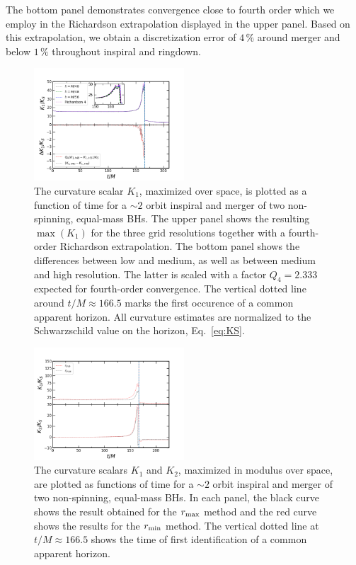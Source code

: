 \documentclass[floats,floatfix,showpacs,amssymb,prd,twocolumn,superscriptaddress,nofootinbib,nolongbibliography,reprint]{revtex4-2}
\begin{document}
The bottom panel
demonstrates convergence close to fourth order which
we employ in the Richardson extrapolation displayed
in the upper panel. Based on this extrapolation, we
obtain a discretization error of $4\,\%$ around
merger and below $1\,\%$ throughout inspiral and ringdown.
%
\begin{figure}
\includegraphics[width=0.5\textwidth]{bhmerger/fig4plt.png}
\caption{
The curvature scalar $K_1$, maximized over space,
is plotted as a function of time for a $\sim 2$ orbit inspiral and merger of two non-spinning, equal-mass BHs.
The upper panel shows the resulting $\max(K_1)$ 
for the three grid resolutions
together with a fourth-order Richardson extrapolation.
The bottom panel shows the differences
between low and medium, as well as between medium
and high resolution. The latter is scaled
with a factor $Q_4=2.333$ expected for
fourth-order convergence. The vertical dotted line
around $t/M\approx 166.5$ marks the first occurence of a
common apparent horizon. All curvature estimates are
normalized to the Schwarzschild value on the horizon, Eq.~\eqref{eq:KS}.
}
\label{fig:k1_conv}
\end{figure}
%
%
\begin{figure}
\includegraphics[width=0.5\textwidth]{bhmerger/fig5plt.png}
\caption{
The curvature scalars $K_1$ and $K_2$, maximized in modulus over
space, are plotted as functions of time for a $\sim 2$ orbit inspiral
and merger of two non-spinning, equal-mass BHs. In each panel,
the black curve
shows the result obtained for the $r_{\rm max}$
method and the red curve shows the results for the
$r_{\rm min}$ method. The vertical dotted line at
$t/M \approx 166.5$ shows the time of first identification
of a common apparent horizon.
}
\label{fig:max_k1k2}
\end{figure}
%
\end{document}
